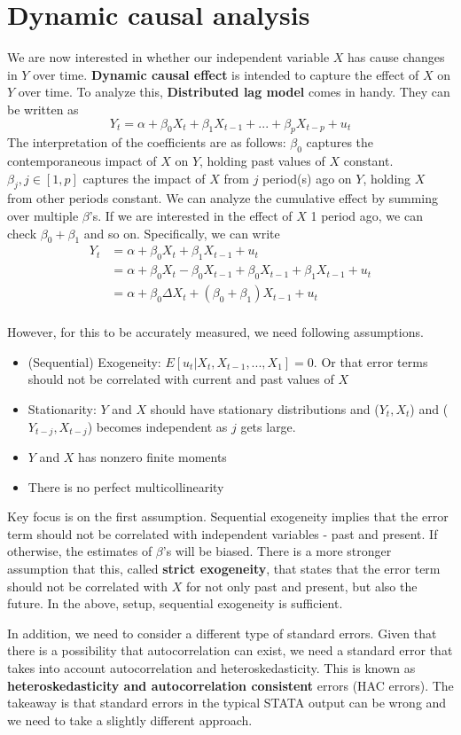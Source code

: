 \section{Dynamic causal analysis}
We are now interested in whether our independent variable $X$ has cause changes in $Y$ over time. \textbf{Dynamic causal effect} is intended to capture the effect of $X$ on $Y$ over time. To analyze this, \textbf{Distributed lag model} comes in handy. They can be written as
\[
Y_t = \alpha+\beta_0X_t + \beta_1X_{t-1}+...+\beta_pX_{t-p}+u_t
\]
The interpretation of the coefficients are as follows: $\beta_0$ captures the contemporaneous impact of $X$ on $Y$, holding past values of $X$ constant. $\beta_j , j\in[1,p]$ captures the impact of $X$ from $j$ period(s) ago on $Y$, holding $X$ from other periods constant. We can analyze the cumulative effect by summing over multiple $\beta$'s. If we are interested in the effect of $X$ 1 period ago, we can check $\beta_0 + \beta_1$ and so on. Specifically, we can write
\[
\begin{aligned}
Y_t& = \alpha+\beta_0X_t + \beta_1X_{t-1}+u_t\\
&=\alpha +\beta_0 X_t - \beta_0X_{t-1} + \beta_0 X_{t-1} + \beta_1 X_{t-1}+u_t \\
&=\alpha + \beta_0\Delta X_t + (\beta_0 + \beta_1)X_{t-1}+u_t\\
\end{aligned}
\]
\par\medskip
However, for this to be accurately measured, we need following assumptions. 
\begin{itemize}
\item (Sequential) Exogeneity: $E[u_t|X_t, X_{t-1},...,X_1]=0$. Or that error terms should not be correlated with current and past values of $X$
\item Stationarity: $Y$ and $X$ should have stationary distributions and ($Y_t, X_t$) and ($Y_{t-j}, X_{t-j}$) becomes independent as $j$ gets large. 
\item $Y$ and $X$ has nonzero finite moments
\item There is no perfect multicollinearity
\end{itemize}
Key focus is on the first assumption. Sequential exogeneity implies that the error term should not be correlated with independent variables - past and present. If otherwise, the estimates of $\beta$'s will be biased. There is a more stronger assumption that this, called \textbf{strict exogeneity}, that states that the error term should not be correlated with $X$ for not only past and present, but also the future. In the above, setup, sequential exogeneity is sufficient.
\par\medskip
In addition, we need to consider a different type of standard errors. Given that there is a possibility that autocorrelation can exist, we need a standard error that takes into account autocorrelation and heteroskedasticity. This is known as \textbf{heteroskedasticity and autocorrelation consistent} errors (HAC errors). The takeaway is that standard errors in the typical STATA output can be wrong and we need to take a slightly different approach. 



